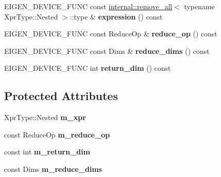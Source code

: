 \begin{DoxyCompactItemize}
\item 
\mbox{\label{class_eigen_1_1_tensor_tuple_reducer_op_ae98721e8a105621a4e7c0bb2c7f05fb8}} 
E\+I\+G\+E\+N\+\_\+\+D\+E\+V\+I\+C\+E\+\_\+\+F\+U\+NC const \hyperlink{struct_eigen_1_1internal_1_1remove__all}{internal\+::remove\+\_\+all}$<$ typename Xpr\+Type\+::\+Nested $>$\+::type \& {\bfseries expression} () const
\item 
\mbox{\label{class_eigen_1_1_tensor_tuple_reducer_op_ac66cab80f82eaf021eeb73f71a63e916}} 
E\+I\+G\+E\+N\+\_\+\+D\+E\+V\+I\+C\+E\+\_\+\+F\+U\+NC const Reduce\+Op \& {\bfseries reduce\+\_\+op} () const
\item 
\mbox{\label{class_eigen_1_1_tensor_tuple_reducer_op_a2f0828e47d33fd105e0e1e6a7e6e7f04}} 
E\+I\+G\+E\+N\+\_\+\+D\+E\+V\+I\+C\+E\+\_\+\+F\+U\+NC const Dims \& {\bfseries reduce\+\_\+dims} () const
\item 
\mbox{\label{class_eigen_1_1_tensor_tuple_reducer_op_acaea785a115dcb17be0d2b857170cfff}} 
E\+I\+G\+E\+N\+\_\+\+D\+E\+V\+I\+C\+E\+\_\+\+F\+U\+NC int {\bfseries return\+\_\+dim} () const
\end{DoxyCompactItemize}
\subsection*{Protected Attributes}
\begin{DoxyCompactItemize}
\item 
\mbox{\label{class_eigen_1_1_tensor_tuple_reducer_op_af281b690cde94999437b1894c0b7dbf4}} 
Xpr\+Type\+::\+Nested {\bfseries m\+\_\+xpr}
\item 
\mbox{\label{class_eigen_1_1_tensor_tuple_reducer_op_a7cbd840dc91eefe06dfff6465176efe8}} 
const Reduce\+Op {\bfseries m\+\_\+reduce\+\_\+op}
\item 
\mbox{\label{class_eigen_1_1_tensor_tuple_reducer_op_a25790ac9233364d66a932cbda9880a31}} 
const int {\bfseries m\+\_\+return\+\_\+dim}
\item 
\mbox{\label{class_eigen_1_1_tensor_tuple_reducer_op_af4bd7bd0c7a73fbb2f0440901101a713}} 
const Dims {\bfseries m\+\_\+reduce\+\_\+dims}
\end{DoxyCompactItemize}
